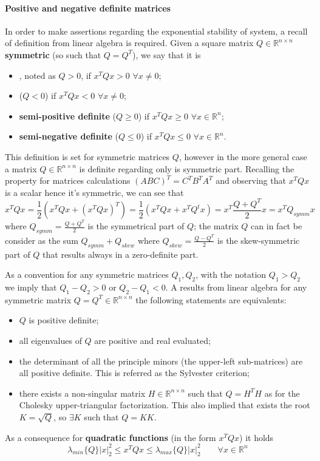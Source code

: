 		\paragraph{Positive and negative definite matrices} \label{sec:positivedefinite}In order to make assertions regarding the exponential stability of system, a recall of definition from linear algebra is required. Given a square matrix $Q\in \mathds R^{n\times n}$ \textbf{symmetric} (so such that $Q=Q^T$), we say that it is
		\begin{itemize}
			\item {}, noted as $Q>0$, if  $x^TQx > 0$ $\forall x\neq 0$;
			\item {} ($Q<0$) if  $x^TQx < 0$ $\forall x\neq 0$;
			\item \textbf{semi-positive definite} ($Q\geq0$) if  $x^TQx \geq 0$ $\forall x \in \mathds R^n$;
			\item \textbf{semi-negative definite} ($Q\leq0$) if  $x^TQx \leq 0$ $\forall x \in \mathds R^n$.
		\end{itemize}
		\begin{note}
			This definition is set for symmetric matrices $Q$, however in the more general case a matrix $Q\in \mathds R^{n\times n}$ is definite regarding only is symmetric part. Recalling the property for matrices calculations $(ABC)^T = C^TB^TA^T$ and observing that $x^T Q x$ is a scalar hence it's symmetric, we can see that
			\[ x^TQx = \frac 1 2 \left( x^TQx + (x^TQx)^T \right) = \frac 1 2 \left( x^T Qx + x^T Q^t x \right) = x^T \frac{Q+ Q^T}{2} x = x^T Q_{symm} x \]
			where $Q_{symm} = \frac{Q+Q^T}{2}$ is the symmetrical part of $Q$; the matrix $Q$ can in fact be consider as the sum $Q_{symm} + Q_{skew}$ where $Q_{skew} = \frac{Q-Q^T}2$ is the skew-symmetric part of $Q$ that results always in a zero-definite part.
		\end{note}
	
		As a convention for any symmetric matrices $Q_1,Q_2$, with the notation $Q_1 > Q_2$ we imply that $Q_1-Q_2 >0$ or $Q_2-Q_1 < 0$. A results from linear algebra for any symmetric matrix $Q= Q^T\in \mathds R^{n\times n}$ the following statements are equivalents:
		\begin{itemize}
			\item $Q$ is positive definite;
			\item all eigenvalues of $Q$ are positive and real evaluated;
			\item the determinant of all the principle minors (the upper-left sub-matrices) are all positive definite. This is referred as the Sylvester criterion;
			\item there exists a non-singular matrix $H\in \mathds R^{n\times n}$ such that $Q= H^TH$ as for the Cholesky upper-triangular factorization. This also implied that exists the root $K=\sqrt Q$, so $\exists K$ such that $Q = K K$.
		\end{itemize}
		As a consequence for \textbf{quadratic functions} (in the form $x^TQx$) it holds
		\begin{equation} \label{eq:lin:sandwich}
			\lambda_{min}\{ Q \} |x|^2_2 \leq x^T Q x \leq \lambda_{max} \{Q\} |x|_2^2 \qquad \forall x \in \mathds R^n
		\end{equation}
		
